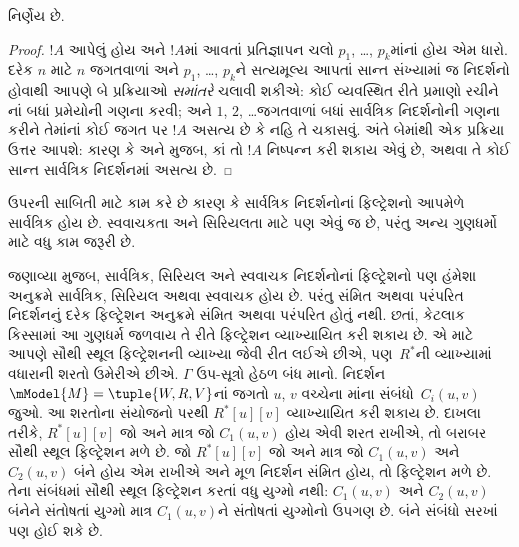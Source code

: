 
\begin{thm}
   નિર્ણેય છે.
\end{thm}

\begin{proof}
  $!A$ આપેલું હોય અને $!A$માં આવતાં પ્રતિજ્ઞાપન ચલો
  $p_1$, \dots, $p_k$માંનાં હોય એમ ધારો. દરેક $n$ માટે $n$ જગતવાળાં
  અને $p_1$, \dots, $p_k$ને સત્યમૂલ્ય આપતાં સાન્ત સંખ્યામાં જ નિદર્શનો
  હોવાથી આપણે બે પ્રક્રિયાઓ \emph{સમાંતરે} ચલાવી શકીએ: કોઈ વ્યવસ્થિત
  રીતે પ્રમાણો રચીને નાં બધાં પ્રમેયોની ગણના કરવી; અને
  $1$, $2$, \dots જગતવાળાં બધાં સાર્વત્રિક નિદર્શનોની ગણના કરીને
  તેમાંનાં કોઈ જગત પર $!A$ અસત્ય છે કે નહિ તે ચકાસવું.
  અંતે બેમાંથી એક પ્રક્રિયા ઉત્તર આપશે: કારણ કે
   અને  મુજબ,
  કાં તો $!A$ નિષ્પન્ન કરી શકાય એવું છે, અથવા તે કોઈ સાન્ત સાર્વત્રિક
  નિદર્શનમાં અસત્ય છે.
\end{proof}

ઉપરની સાબિતી  માટે કામ કરે છે કારણ કે સાર્વત્રિક
નિદર્શનોનાં ફિલ્ટ્રેશનો આપમેળે સાર્વત્રિક હોય છે. સ્વવાચકતા અને
સિરિયલતા માટે પણ એવું જ છે, પરંતુ અન્ય ગુણધર્મો માટે વધુ કામ
જરૂરી છે.
\endgroup

\begingroup
\makeatletter{}\makeatother


\label{guunit:OLP-0458}


જણાવ્યા મુજબ, સાર્વત્રિક, સિરિયલ અને સ્વવાચક નિદર્શનોનાં
ફિલ્ટ્રેશનો પણ હંમેશા અનુક્રમે સાર્વત્રિક, સિરિયલ અથવા સ્વવાચક
હોય છે. પરંતુ સંમિત અથવા પરંપરિત નિદર્શનનું દરેક ફિલ્ટ્રેશન
અનુક્રમે સંમિત અથવા પરંપરિત હોતું નથી. છતાં, કેટલાક કિસ્સામાં
આ ગુણધર્મ જળવાય તે રીતે ફિલ્ટ્રેશન વ્યાખ્યાયિત કરી શકાય છે.
એ માટે આપણે સૌથી સ્થૂલ ફિલ્ટ્રેશનની વ્યાખ્યા જેવી રીત લઈએ છીએ,
પણ~$R^*$ની વ્યાખ્યામાં વધારાની શરતો ઉમેરીએ છીએ. $\Gamma$
ઉપ-સૂત્રો હેઠળ બંધ માનો. નિદર્શન
$\mModel{M} =\tuple{W, R, V}$નાં જગતો $u$, $v$ વચ્ચેના
માંના સંબંધો~$C_i(u,v)$ જુઓ.
આ શરતોના સંયોજનો પરથી $R^*[u][v]$ વ્યાખ્યાયિત કરી શકાય છે.
દાખલા તરીકે, $R^*[u][v]$ જો અને માત્ર જો $C_1(u,v)$ હોય એવી
શરત રાખીએ, તો બરાબર સૌથી સ્થૂલ ફિલ્ટ્રેશન મળે છે. જો
$R^*[u][v]$ જો અને માત્ર જો $C_1(u,v)$ અને $C_2(u, v)$ બંને
હોય એમ રાખીએ અને મૂળ નિદર્શન સંમિત હોય, તો ફિલ્ટ્રેશન મળે છે.
તેના સંબંધમાં સૌથી સ્થૂલ ફિલ્ટ્રેશન કરતાં વધુ યુગ્મો નથી:
$C_1(u,v)$ અને $C_2(u,v)$ બંનેને સંતોષતાં યુગ્મો માત્ર
$C_1(u,v)$ને સંતોષતાં યુગ્મોનો ઉપગણ છે. બંને સંબંધો સરખાં પણ
હોઈ શકે છે.

